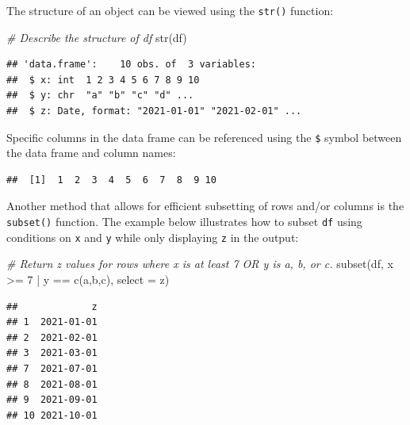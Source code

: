 \documentclass[
]{book}
\newenvironment{Shaded}{\begin{snugshade}}{\end{snugshade}}
\newcommand{\AttributeTok}[1]{\textcolor[rgb]{0.77,0.63,0.00}{#1}}
\newcommand{\CommentTok}[1]{\textcolor[rgb]{0.56,0.35,0.01}{\textit{#1}}}
\newcommand{\DecValTok}[1]{\textcolor[rgb]{0.00,0.00,0.81}{#1}}
\newcommand{\FunctionTok}[1]{\textcolor[rgb]{0.00,0.00,0.00}{#1}}
\newcommand{\NormalTok}[1]{#1}
\newcommand{\SpecialCharTok}[1]{\textcolor[rgb]{0.00,0.00,0.00}{#1}}
\newcommand{\StringTok}[1]{\textcolor[rgb]{0.31,0.60,0.02}{#1}}
\begin{document}
The structure of an object can be viewed using the \texttt{str()} function:

\begin{Shaded}
\begin{Highlighting}[]
\CommentTok{\# Describe the structure of df}
\FunctionTok{str}\NormalTok{(df)}
\end{Highlighting}
\end{Shaded}

\begin{verbatim}
## 'data.frame':    10 obs. of  3 variables:
##  $ x: int  1 2 3 4 5 6 7 8 9 10
##  $ y: chr  "a" "b" "c" "d" ...
##  $ z: Date, format: "2021-01-01" "2021-02-01" ...
\end{verbatim}

Specific columns in the data frame can be referenced using the \texttt{\$} symbol between the data frame and column names:

\begin{Shaded}
\end{Shaded}

\begin{verbatim}
##  [1]  1  2  3  4  5  6  7  8  9 10
\end{verbatim}

Another method that allows for efficient subsetting of rows and/or columns is the \texttt{subset()} function. The example below illustrates how to subset \texttt{df} using conditions on \texttt{x} and \texttt{y} while only displaying \texttt{z} in the output:

\begin{Shaded}
\begin{Highlighting}[]
\CommentTok{\# Return z values for rows where x is at least 7 OR y is a, b, or c.}
\FunctionTok{subset}\NormalTok{(df, x }\SpecialCharTok{\textgreater{}=} \DecValTok{7} \SpecialCharTok{|}\NormalTok{ y }\SpecialCharTok{==} \FunctionTok{c}\NormalTok{(}\StringTok{\textquotesingle{}a\textquotesingle{}}\NormalTok{,}\StringTok{\textquotesingle{}b\textquotesingle{}}\NormalTok{,}\StringTok{\textquotesingle{}c\textquotesingle{}}\NormalTok{), }\AttributeTok{select =}\NormalTok{ z)}
\end{Highlighting}
\end{Shaded}

\begin{verbatim}
##             z
## 1  2021-01-01
## 2  2021-02-01
## 3  2021-03-01
## 7  2021-07-01
## 8  2021-08-01
## 9  2021-09-01
## 10 2021-10-01
\end{verbatim}
\end{document}
